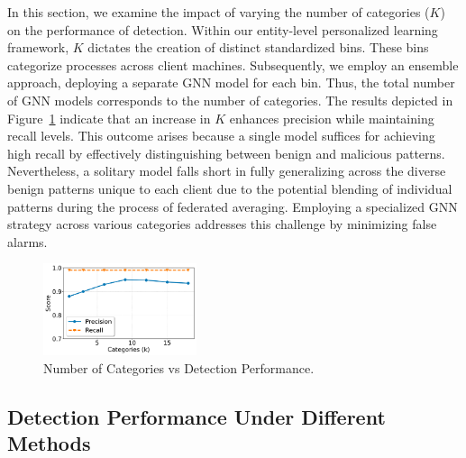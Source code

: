  In this section, we examine the impact of varying the number of categories ($K$) on the performance of detection. Within our entity-level personalized \gnnshort learning framework, $K$ dictates the creation of distinct standardized bins. These bins categorize processes across client machines. Subsequently, we employ an ensemble approach, deploying a separate GNN model for each bin. Thus, the total number of GNN models corresponds to the number of categories. The results depicted in Figure~\ref{catgvsscore} indicate that an increase in $K$ enhances precision while maintaining recall levels. This outcome arises because a single model suffices for achieving high recall by effectively distinguishing between benign and malicious patterns. Nevertheless, a solitary model falls short in fully generalizing across the diverse benign patterns unique to each client due to the potential blending of individual patterns during the process of federated averaging. Employing a specialized GNN strategy across various categories addresses this challenge by minimizing false alarms.

\begin{figure}[t!]
  \centering
  \includegraphics[width=0.4\textwidth]{fig/kvsscore.pdf}
  \caption{Number of Categories vs Detection Performance.}
  \label{catgvsscore}
  \vspace{-2ex}
\end{figure}

\subsection{Detection Performance Under Different Methods}



